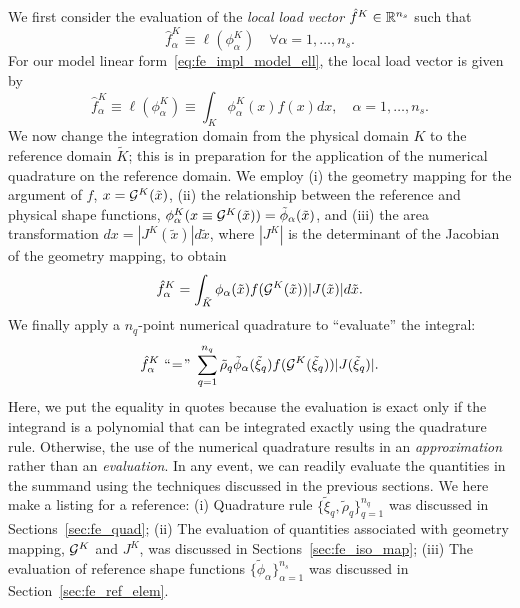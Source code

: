 We first consider the evaluation of the \emph{local load vector} $\hat f^K \in \mathbb{R}^{n_s}$ such that
\begin{equation*}
  \hat f^K_\alpha \equiv \ell(\phi^K_\alpha) \quad \forall \alpha = 1,\dots,n_s.
\end{equation*}
For our model linear form~\eqref{eq:fe_impl_model_ell}, the local load vector is given by
\begin{equation*}
  \hat f^K_\alpha
  \equiv \ell(\phi^K_\alpha) \equiv \int_K \phi^K_\alpha(x) f(x) dx , \quad \alpha = 1,\dots, n_s.
\end{equation*}
We now change the integration domain from the physical domain $K$ to the reference domain $\tilde K$; this is in preparation for the application of the numerical quadrature on the reference domain.  We employ (i) the geometry mapping for the argument of $f$, $x = \mathcal{G}^K(\tilde x)$, (ii) the relationship between the reference and physical shape functions, $\phi^K_\alpha(x \equiv \mathcal{G}^K(\tilde x)) = \tilde \phi_\alpha(\tilde x)$, and (iii) the area transformation $dx = |J^K(\tilde x)| d \tilde x$, where $|J^K|$ is the determinant of the Jacobian of the geometry mapping, to obtain 
\begin{equation}
  \hat f^K_\alpha
  = \int_{\tilde K} \phi_\alpha(\tilde x) f(\mathcal{G}^K(\tilde x)) |J(\tilde x)| d \tilde x .
  \label{eq:fe_impl_loc_vec_2}
\end{equation}
We finally apply a $n_q$-point numerical quadrature to ``evaluate'' the integral:
\begin{equation*}
    \hat f^K_\alpha \
    \text{``}\hspace{-0.2em}=\hspace{-0.2em}\text{''}
    \ \sum_{q=1}^{n_q} \tilde \rho_q \tilde \phi_\alpha(\tilde \xi_q) f(\mathcal{G}^K(\tilde \xi_q)) |J(\tilde \xi_q)| .
\end{equation*}
Here, we put the equality in quotes because the evaluation is exact only if the integrand is a polynomial that can be integrated exactly using the quadrature rule.  Otherwise, the use of the numerical quadrature results in an \emph{approximation} rather than an \emph{evaluation}. In any event, we can readily evaluate the quantities in the summand using the techniques discussed in the previous sections. We here make a listing for a reference: 
(i) Quadrature rule $\{\tilde \xi_q, \tilde \rho_q\}_{q=1}^{n_q}$ was discussed in Sections~\ref{sec:fe_quad};
(ii) The evaluation of quantities associated with geometry mapping, $\mathcal{G}^K$ and $J^K$, was discussed in Sections~\ref{sec:fe_iso_map};
(iii) The evaluation of reference shape functions $\{\tilde \phi_\alpha \}_{\alpha=1}^{n_s}$ was discussed in Section~\ref{sec:fe_ref_elem}.

